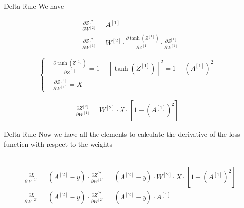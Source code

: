 \documentclass[11pt]{beamer}
\begin{document}
\begin{frame}{Delta Rule}
We have

\begin{align*}
& \frac{\partial Z^{[2]}}{\partial W^{[2]}} = A^{[1]} \\
& \frac{\partial Z^{[2]}}{\partial W^{[1]}} = W^{[2]} \cdot \frac{\partial \tanh\left(Z^{[1]} \right)}{\partial Z^{[1]}} \cdot \frac{\partial Z^{[1]}}{\partial W^{[1]}}
\end{align*}

\begin{equation}
\left\{
\begin{aligned}
& \frac{\partial \tanh\left(Z^{[1]} \right)}{\partial Z^{[1]}}  = 1 - \left[ \tanh\left(Z^{[1]} \right) \right]^2 = 
1 - \left( A^{[1]} \right)^2 \\
& \frac{\partial Z^{[1]}}{\partial W^{[1]}} = X
\end{aligned}
\right.
\end{equation} 

\begin{align*}
\frac{\partial Z^{[2]}}{\partial W^{[1]}} = W^{[2]} \cdot X \cdot \left[ 1 - \left( A^{[1]} \right)^2 \right]
\end{align*}

\end{frame}
\begin{frame}{Delta Rule}
Now we have all the elements to calculate the derivative of the loss function with respect to the weights \\\\

\begin{tcolorbox}
\begin{align*}
& \frac{\partial L}{\partial W^{[1]}} = \left( A^{[2]} - y \right) \cdot \frac{\partial Z^{[2]}}{\partial W^{[1]}} = \left( A^{[2]} - y \right) \cdot W^{[2]} \cdot X \cdot \left[ 1 - \left( A^{[1]} \right)^2 \right] \\
& \frac{\partial L}{\partial W^{[2]}} = \left( A^{[2]} - y \right) \cdot \frac{\partial Z^{[2]}}{\partial W^{[2]}} = 
\left( A^{[2]} - y \right) \cdot A^{[1]}
\end{align*}
\end{tcolorbox}
\end{frame}
\end{document}
